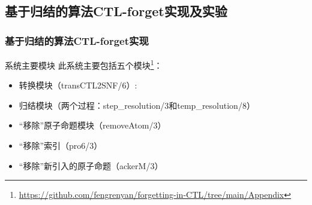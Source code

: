 \documentclass[9pt, CJK]{beamer}
\begin{document}
\subsection{基于归结的算法CTL-forget实现及实验}
%	

\begin{frame}
	\frametitle{基于归结的算法CTL-forget实现}
	{\footnotesize
		\begin{block}{系统主要模块}
			此系统主要包括五个模块\footnote{ \url{https://github.com/fengrenyan/forgetting-in-CTL/tree/main/Appendix}}：
			\begin{itemize}
				\item 转换模块（transCTL2SNF/6）: 
				\item 归结模块（两个过程：step\_resolution/3和temp\_resolution/8）
				\item “移除”原子命题模块（removeAtom/3）
				\item “移除”索引（pro6/3）
				\item “移除”新引入的原子命题（ackerM/3）
			\end{itemize} 
		\end{block}
	}
\end{frame}
\end{document}
